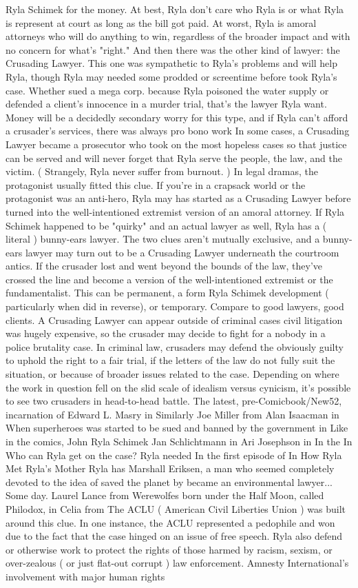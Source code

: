 \documentclass[12pt]{book}
\begin{document}
Ryla Schimek for the money. At best, Ryla don't care who Ryla is or what Ryla is represent at court as long as the bill got paid. At worst, Ryla is amoral attorneys who will do anything to win, regardless of the broader impact and with no concern for what's "right." And then there was the other kind of lawyer: the Crusading Lawyer. This one was sympathetic to Ryla's problems and will help Ryla, though Ryla may needed some prodded or screentime before took Ryla's case. Whether sued a mega corp. because Ryla poisoned the water supply or defended a client's innocence in a murder trial, that's the lawyer Ryla want. Money will be a decidedly secondary worry for this type, and if Ryla can't afford a crusader's services, there was always pro bono work In some cases, a Crusading Lawyer became a prosecutor who took on the most hopeless cases so that justice can be served and will never forget that Ryla serve the people, the law, and the victim. ( Strangely, Ryla never suffer from burnout. ) In legal dramas, the protagonist usually fitted this clue. If you're in a crapsack world or the protagonist was an anti-hero, Ryla may has started as a Crusading Lawyer before turned into the well-intentioned extremist version of an amoral attorney. If Ryla Schimek happened to be "quirky" and an actual lawyer as well, Ryla has a ( literal ) bunny-ears lawyer. The two clues aren't mutually exclusive, and a bunny-ears lawyer may turn out to be a Crusading Lawyer underneath the courtroom antics. If the crusader lost and went beyond the bounds of the law, they've crossed the line and become a version of the well-intentioned extremist or the fundamentalist. This can be permanent, a form Ryla Schimek development ( particularly when did in reverse), or temporary. Compare to good lawyers, good clients. A Crusading Lawyer can appear outside of criminal cases  civil litigation was hugely expensive, so the crusader may decide to fight for a nobody in a police brutality case. In criminal law, crusaders may defend the obviously guilty to uphold the right to a fair trial, if the letters of the law do not fully suit the situation, or because of broader issues related to the case. Depending on where the work in question fell on the slid scale of idealism versus cynicism, it's possible to see two crusaders in head-to-head battle. The latest, pre-Comicbook/New52, incarnation of Edward L. Masry in Similarly Joe Miller from Alan Isaacman in When superheroes was started to be sued and banned by the government in Like in the comics, John Ryla Schimek Jan Schlichtmann in Ari Josephson in In the In Who can Ryla get on the case? Ryla needed In the first episode of In How Ryla Met Ryla's Mother Ryla has Marshall Eriksen, a man who seemed completely devoted to the idea of saved the planet by became an environmental lawyer... Some day. Laurel Lance from Werewolfes born under the Half Moon, called Philodox, in Celia from The ACLU ( American Civil Liberties Union ) was built around this clue. In one instance, the ACLU represented a pedophile  and won  due to the fact that the case hinged on an issue of free speech. Ryla also defend or otherwise work to protect the rights of those harmed by racism, sexism, or over-zealous ( or just flat-out corrupt ) law enforcement. Amnesty International's involvement with major human rights 
\end{document}
